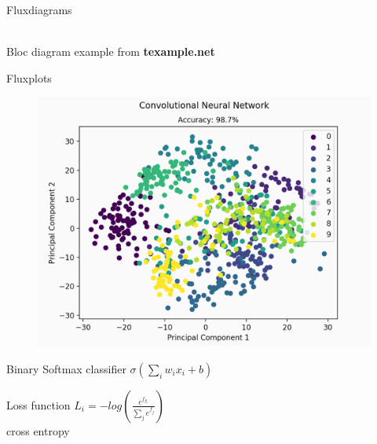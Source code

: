 \documentclass[9pt]{beamer}
\begin{document}
\begin{frame}{Flux}{diagrams}
\centering
{}\\[0.4cm]
Bloc diagram example from \textbf{texample.net}
\end{frame}

\begin{frame}{Flux}{plots}
	\begin{minipage}{0.58\textwidth}
		\begin{figure}
			\includegraphics[width=\textwidth]{assets/plot.png}
		\end{figure}
	\end{minipage}
	\hfill
	\begin{minipage}{0.4\textwidth}
		\begin{block}{Binary Softmax classifier}
			\centering
			$\sigma(\sum_i w_ix_i + b)$
		\end{block}
		\begin{exampleblock}{Loss function}
			\centering\vspace*{0.1cm}
			$L_i = -log(\frac{e^{f_{y_i}}}{\sum_j e^{f_j}})$\\[0.1cm]
			cross entropy
		\end{exampleblock}
	\end{minipage}
\end{frame}
\end{document}
